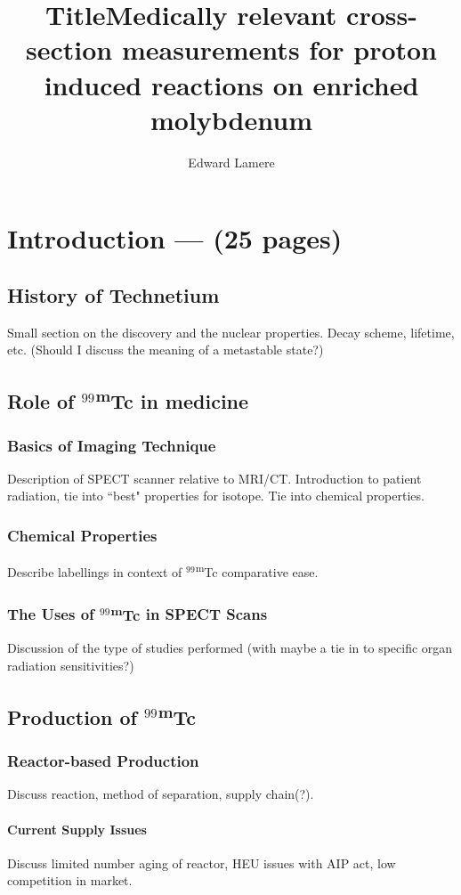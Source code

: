 \documentclass[final,3p,times,twocolumn,authoryear]{elsarticle_modified}
\newcommand{\tc}{ {\normalfont $^{99}$\textsuperscript{m}Tc} }
\begin{document}
\begin{frontmatter}

\title{Title}
\author{Edward Lamere}
\title{Medically relevant cross-section  measurements for proton induced reactions on enriched molybdenum}
\end{frontmatter}

\section{Introduction --- (25 pages)}\label{intro}
	\subsection{History of Technetium} %
	Small section on the discovery and the nuclear properties. Decay scheme, lifetime, etc. (Should I discuss the meaning of a metastable state?)
	\subsection{Role of \tc in medicine} 
		\subsubsection{Basics of Imaging Technique}
		Description of SPECT scanner relative to MRI/CT. Introduction to patient radiation, tie into ``best" properties for isotope.
		Tie into chemical properties. 
		\subsubsection{Chemical Properties} Describe labellings in context of \tc comparative ease.
		\subsubsection{The Uses of \tc in SPECT Scans}Discussion of the type of studies performed (with maybe a tie in to specific organ radiation sensitivities?)
	\subsection{Production of \tc}
		\subsubsection{Reactor-based Production}
		Discuss reaction, method of separation, supply chain(?).
			\paragraph{Current Supply Issues}
			Discuss limited number aging of reactor, HEU issues with AIP act, low competition in market.
\end{document}
